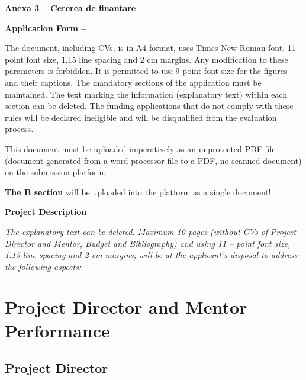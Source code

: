 \documentclass[draftproposal,pncdib]{pncdi-pd}
\begin{document}
\begin{pncdiexplanation}
\textbf{Anexa 3 -- Cererea de finanțare}

\vfill
\begin{center}
\Large
\textbf{Application Form -- \insertpncdiidentifier}
\end{center}

\bigskip

The document, including CVs, is in A4 format, uses Times New Roman font, 11 point font
size, 1.15 line spacing and 2 cm margins. Any modification to these parameters is
forbidden. It is permitted to use 9-point font size for the figures and their captions.
The mandatory sections of the application must be maintained. The text marking the
information (explanatory text) within each section can be deleted. The funding
applications that do not comply with these rules will be declared ineligible and will be
disqualified from the evaluation process.

\medskip

This document must be uploaded imperatively as an unprotected PDF file (document
generated from a word processor file to a PDF, no scanned document) on the submission
platform.

\vfill

\newpage
\end{pncdiexplanation}

\begin{pncdiexplanation}
\textbf{The B section} will be uploaded into the platform as a single document!
\medskip

\textbf{Project Description}

\textit{The explanatory text can be deleted. Maximum 10 pages (without CVs of
Project Director and Mentor, Budget and Bibliography) and using 11 – point font size,
1.15 line spacing and 2 cm margins, will be at the applicant’s disposal to address the
following aspects:}
\end{pncdiexplanation}

\section{Project Director and Mentor Performance}
\label{sc:perf}

\subsection{Project Director}
\label{sc:perf:director}
\end{document}
